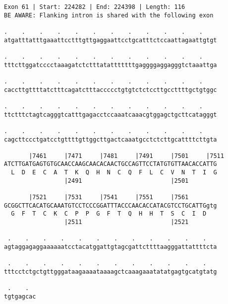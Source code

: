 \documentclass{article}
\begin{document}
\begin{Verbatim}
Exon 61 | Start: 224282 | End: 224398 | Length: 116
BE AWARE: Flanking intron is shared with the following exon
 
.    .    .    .    .    .    .    .    .    .    .    .    
atgatttatttgaaattcctttgttgaggaattcctgcatttctccaattagaattgtgt
  
.    .    .    .    .    .    .    .    .    .    .    .    
tttcttggatcccctaaagatctctttatatttttttgaggggaggagggtctaaattga
  
.    .    .    .    .    .    .    .    .    .    .    .    
caccttgttttatctttcagatctttaccccctgtgtctctccttgccttttgctgtggc
  
.    .    .    .    .    .    .    .    .    .    .    .    
ttctttctagtcagggtcatttgagacctccaaatcaaacgtggagctgcttcatagggt
  
.    .    .    .    .    .    .    .    .    .    .    .    
cagcttccctgatcctgttttgttggcttgactcaaatgcctctcttgcattttcttgta
  
       |7461     |7471     |7481     |7491     |7501     |7511
ATCTTGATGAGTGTGCAACCAAGCAACACAACTGCCAGTTCCTATGTGTTAACACCATTG
  L  D  E  C  A  T  K  Q  H  N  C  Q  F  L  C  V  N  T  I  G
                 |2491                         |2501        
  
       |7521     |7531     |7541     |7551     |7561        
GCGGCTTCACATGCAAATGTCCTCCCGGATTTACCCAACACCATACGTCCTGCATTGgtg
  G  F  T  C  K  C  P  P  G  F  T  Q  H  H  T  S  C  I  D   
                 |2511                         |2521        
  
 .    .    .    .    .    .    .    .    .    .    .    .   
agtaggagaggaaaaaatcctacatggattgtagcgattcttttaagggattattttcta
  
 .    .    .    .    .    .    .    .    .    .    .    .   
tttcctctgctgttgggataagaaaataaaagctcaaagaaatatatgagtgcatgtatg
  
 .    .  
tgtgagcac
\end{Verbatim}
\newpage
\end{document}

